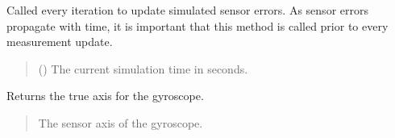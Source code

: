 \documentclass[letterpaper,10pt,english]{sphinxmanual}
\begin{document}
\begin{fulllineitems}
\begin{fulllineitems}
\label{\detokenize{modules/measurement/gyroscope:qnav.measurement.gyroscope.Gyroscope.update}}
\pysigstartsignatures
{}
\pysigstopsignatures
\sphinxAtStartPar
Called every iteration to update simulated sensor errors.
As sensor errors propagate with time, it is important that this
method is called prior to every measurement update.
\begin{quote}\begin{description}
\sphinxAtStartPar
{} () \textendash{} The current simulation time in seconds.

\end{description}\end{quote}

\end{fulllineitems}


\begin{fulllineitems}
\label{\detokenize{modules/measurement/gyroscope:qnav.measurement.gyroscope.Gyroscope.sensor_axis}}
\pysigstartsignatures
{}
\pysigstopsignatures
\sphinxAtStartPar
Returns the true axis for the gyroscope.
\begin{quote}\begin{description}
\sphinxAtStartPar
The sensor axis of the gyroscope.

\sphinxAtStartPar
{\hyperref[\detokenize{modules/measurement/platform:qnav.measurement.platform.SensorAxis}]{}}

\end{description}\end{quote}

\end{fulllineitems}


\end{fulllineitems}
\end{document}
